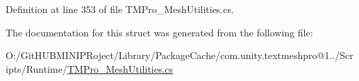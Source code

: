 Definition at line 353 of file T\+M\+Pro\+\_\+\+Mesh\+Utilities.\+cs.



The documentation for this struct was generated from the following file\+:\begin{DoxyCompactItemize}
\item 
O\+:/\+Git\+H\+U\+B\+M\+I\+N\+I\+P\+Roject/\+Library/\+Package\+Cache/com.\+unity.\+textmeshpro@1../\+Scripts/\+Runtime/\mbox{\hyperlink{_t_m_pro___mesh_utilities_8cs}{T\+M\+Pro\+\_\+\+Mesh\+Utilities.\+cs}}\end{DoxyCompactItemize}
